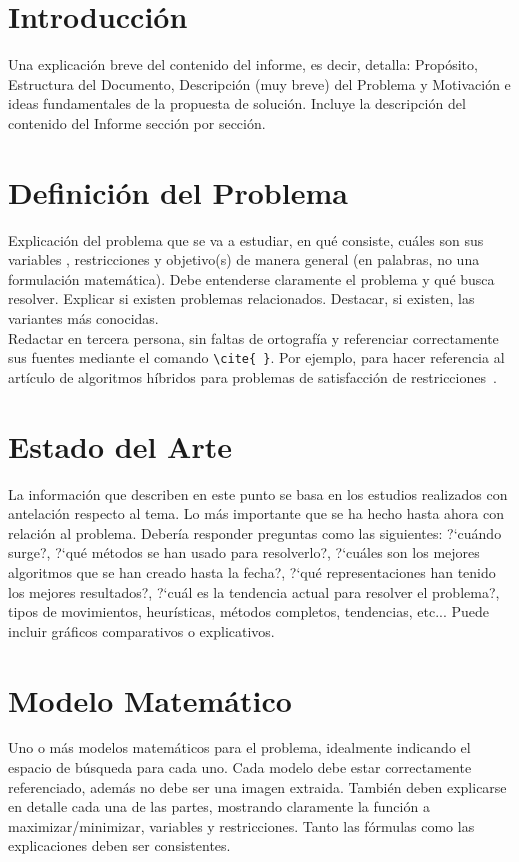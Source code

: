 \documentclass[letter, 10pt]{article}
\begin{document}
\section{Introducci\'on}
Una explicaci\'on breve del contenido del informe, es decir, detalla: Prop\'osito, Estructura del Documento, Descripci\'on (muy breve) del Problema y Motivaci\'on e ideas fundamentales de la propuesta de soluci\'on. Incluye la descripci\'on del contenido del Informe secci\'on por secci\'on.

\section{Definici\'on del Problema}
Explicaci\'on del problema que se va a estudiar, en qu\'e consiste, cu\'ales son sus variables , restricciones y objetivo(s) de manera general (en palabras, no una formulaci\'on matem\'atica). Debe entenderse claramente el problema y qu\'e busca resolver.
Explicar si existen problemas relacionados.
Destacar, si existen, las variantes m\'as conocidas.\\
Redactar en tercera persona, sin faltas de ortograf\'ia y referenciar correctamente sus fuentes mediante el comando  \verb+\cite{ }+. Por ejemplo, para hacer referencia al art\'iculo de algoritmos h\'ibridos para problemas de satisfacci\'on de restricciones~\cite{Prosser93Hybrid}.

\section{Estado del Arte}
La informaci\'on que describen en este punto se basa en los estudios realizados con antelaci\'on respecto al tema.
Lo m\'as importante que se ha hecho hasta ahora con relaci\'on al problema. Deber\'ia responder preguntas como las siguientes:
?`cu\'ando surge?, ?`qu\'e m\'etodos se han usado para resolverlo?, ?`cu\'ales son los mejores algoritmos que se han creado hasta
la fecha?, ?`qu\'e representaciones han tenido los mejores resultados?, ?`cu\'al es la tendencia actual para resolver el problema?, tipos de movimientos, heur\'isticas, m\'etodos completos, tendencias, etc... Puede incluir gr\'aficos comparativos o explicativos.\\

\section{Modelo Matem\'atico}
Uno o m\'as modelos matem\'aticos para el problema, idealmente indicando el espacio de b\'usqueda para cada uno. Cada modelo debe estar correctamente referenciado, adem\'as no debe ser una imagen extraida. Tambi\'en deben explicarse en detalle cada una de las partes, mostrando claramente la funci\'on a maximizar/minimizar, variables y restricciones. Tanto las f\'ormulas como las explicaciones deben ser consistentes.
\end{document}
